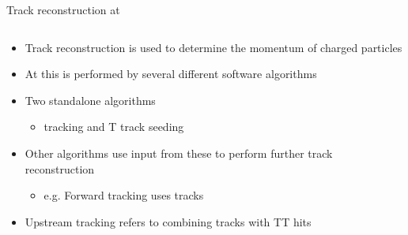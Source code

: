 \documentclass[aspectratio=1610]{beamer}
\begin{document}
\begin{frame}{Track reconstruction at \lhcb}

\begin{columns}
\begin{column}{0.5\textwidth}
\begin{itemize}
\item Track reconstruction is used to determine the momentum of charged particles
\end{itemize}

\begin{itemize}
\item At \lhcb this is performed by several different software algorithms
\end{itemize}
\begin{itemize}
\item Two standalone algorithms 
  \begin{itemize}
    \item[\ding{70}] \velo tracking and T track seeding
  \end{itemize}
\item Other algorithms use input from these to perform further track reconstruction
  \begin{itemize}
    \item[\ding{70}] e.g. Forward tracking uses \velo tracks
  \end{itemize}
\end{itemize}

\begin{itemize}
  \item[\ding{70}] Upstream tracking refers to combining \velo tracks with TT hits
\end{itemize}


\end{column}
\end{columns}
\end{frame}
\end{document}

